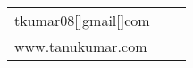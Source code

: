 \documentclass[letterpaper, 10.5pt]{article}
\begin{document}


\vspace{0.3cm} 
\begin{center}
\begin{tabular}{lll}
 tkumar08[]gmail[]com      &
\hspace{3.7in}     &
\hspace{3.7in} 	 \\


www.tanukumar.com  & 
\hspace{3.7in}  & 
\hspace{3.7in} \end{tabular}
\end{center}


\setlength{\tabcolsep}{8pt}
\end{document}
